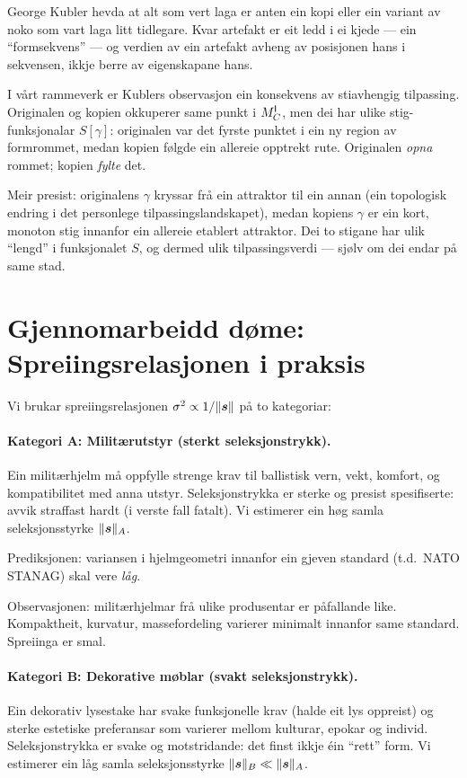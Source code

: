 George Kubler hevda at alt som vert laga er anten ein kopi eller
ein variant av noko som vart laga litt tidlegare. Kvar artefakt er
eit ledd i ei kjede --- ein ``formsekvens'' --- og verdien av ein
artefakt avheng av posisjonen hans i sekvensen, ikkje berre av
eigenskapane hans.

I vårt rammeverk er Kublers observasjon ein konsekvens av
stiavhengig tilpassing. Originalen og kopien okkuperer same punkt
i $M^{\mathsf{I}}_C$, men dei har ulike stig-funksjonalar $S[\gamma]$:
originalen var det fyrste punktet i ein ny region av formrommet,
medan kopien følgde ein allereie opptrekt rute. Originalen
\emph{opna} rommet; kopien \emph{fylte} det.

Meir presist: originalens $\gamma$ kryssar frå ein attraktor til
ein annan (ein topologisk endring i det personlege
tilpassingslandskapet), medan kopiens $\gamma$ er ein kort,
monoton stig innanfor ein allereie etablert attraktor. Dei to
stigane har ulik ``lengd'' i funksjonalet $S$, og dermed ulik
tilpassingsverdi --- sjølv om dei endar på same stad.


\section{Gjennomarbeidd døme: Spreiingsrelasjonen i praksis}

Vi brukar spreiingsrelasjonen $\sigma^2 \propto 1/\lVert \bm{s} \rVert$
på to kategoriar:

\paragraph{Kategori A: Militærutstyr (sterkt seleksjonstrykk).}
Ein militærhjelm må oppfylle strenge krav til ballistisk vern,
vekt, komfort, og kompatibilitet med anna utstyr. Seleksjonstrykka
er sterke og presist spesifiserte: avvik straffast hardt (i verste
fall fatalt). Vi estimerer ein høg samla seleksjonsstyrke
$\lVert \bm{s} \rVert_A$.

\medskip
Prediksjonen: variansen i hjelmgeometri innanfor ein gjeven
standard (t.d.\ NATO STANAG) skal vere \emph{låg}.

\medskip
Observasjonen: militærhjelmar frå ulike produsentar er
påfallande like. Kompaktheit, kurvatur, massefordeling varierer
minimalt innanfor same standard. Spreiinga er smal.

\paragraph{Kategori B: Dekorative møblar (svakt seleksjonstrykk).}
Ein dekorativ lysestake har svake funksjonelle krav (halde eit lys
oppreist) og sterke estetiske preferansar som varierer mellom
kulturar, epokar og individ. Seleksjonstrykka er svake og
motstridande: det finst ikkje éin ``rett'' form. Vi estimerer ein
låg samla seleksjonsstyrke $\lVert \bm{s} \rVert_B \ll \lVert \bm{s} \rVert_A$.

